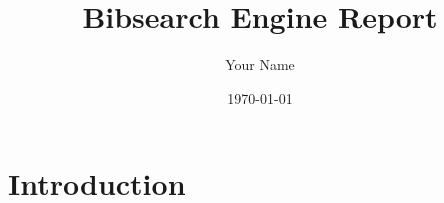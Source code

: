 \documentclass{article}
\begin{document}
\title{Bibsearch Engine Report}
\author{Your Name}
\date{\today}

\maketitle
\newpage
\tableofcontents

\newpage


\section{Introduction}



\end{document}
